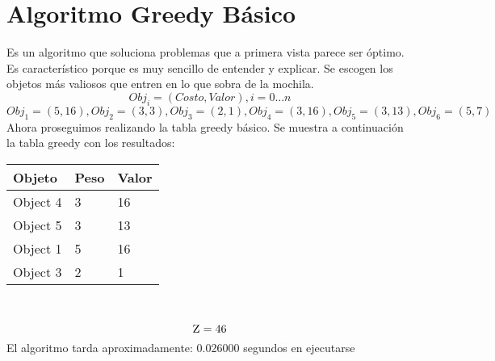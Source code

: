\documentclass[10pt,letterpaper]{article}
\begin{document}
\section{Algoritmo Greedy Básico} 
        Es un algoritmo que soluciona problemas que a primera vista parece ser 
        óptimo. Es característico porque es muy sencillo de entender y explicar. 
        Se escogen los objetos más valiosos que entren en lo que sobra de la mochila. 
        \[ Obj_{i} = (Costo, Valor), i = 0...n \]
\[ Obj_{1} = (5, 16), Obj_{2} = (3, 3), Obj_{3} = (2, 1), Obj_{4} = (3, 16), Obj_{5} = (3, 13), Obj_{6} = (5, 7) \]
\newline Ahora proseguimos realizando la tabla greedy básico.
Se muestra a continuación la tabla greedy con los resultados: 
\begin{center}
\begin{tabu} to 0.6\textwidth { | X[l] | X[l] | X[l] | } 
\hline
{}
\textbf{Objeto} & \textbf{Peso} & \textbf{Valor}\\
\hline
Object 4 & 3 & 16 \\
\hline
Object 5 & 3 & 13 \\
\hline
Object 1 & 5 & 16 \\
\hline
Object 3 & 2 & 1 \\
\hline
\end{tabu} \\
\end{center}
\[ \textsc{\normalsize Z}\\[0.5cm] = 46 \] 
\newline El algoritmo tarda aproximadamente: 0.026000 segundos en ejecutarse
\end{document}

